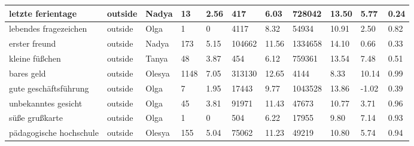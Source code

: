 \begin{longtable}{|p{3cm}|p{1cm}|p{1cm}|R{0.8cm}|R{0.8cm}|R{1.2cm}|R{1cm}|R{1.3cm}|R{1cm}|R{0.8cm}|R{0.6cm}|}
letzte ferientage                                                  & outside     & Nadya     & 13                  & 2.56                      & 417        & 6.03             & 728042       & 13.50                 & 5.77  & 0.24                 \\ \hline
lebendes fragezeichen                                              & outside     & Olga      & 1                   & 0                      & 4117       & 8.32             & 54934        & 10.91                 & 2.50  & 0.82                 \\ \hline
erster freund                                                      & outside     & Nadya     & 173                 & 5.15                      & 104662     & 11.56            & 1334658      & 14.10                 & 0.66  & 0.33                 \\ \hline
kleine f\"{u}{\ss}chen                                             & outside     & Tanya     & 48                  & 3.87                      & 454        & 6.12             & 759361       & 13.54                 & 7.48  & 0.51                 \\ \hline
bares geld                                                         & outside     & Olesya    & 1148                & 7.05                      & 313130     & 12.65            & 4144         & 8.33                  & 10.14 & 0.99                 \\ \hline
gute gesch\"{a}ftsf\"{u}hrung                                      & outside     & Olga      & 7                   & 1.95                      & 17443      & 9.77             & 1043528      & 13.86                 & -1.02 & 0.39                 \\ \hline
unbekanntes gesicht                                                & outside     & Olga      & 45                  & 3.81                      & 91971      & 11.43            & 47673        & 10.77                 & 3.71  & 0.96                 \\ \hline
s\"{u}{\ss}e gru{\ss}karte                                         & outside     & Olga      & 1                   & 0                      & 504        & 6.22             & 17955        & 9.80                  & 7.14  & 0.93                 \\ \hline
p\"{a}dagogische hochschule                                        & outside     & Olesya    & 155                 & 5.04                      & 75062      & 11.23            & 49219        & 10.80                 & 5.74  & 0.94                 \\ \hline

\end{longtable}
